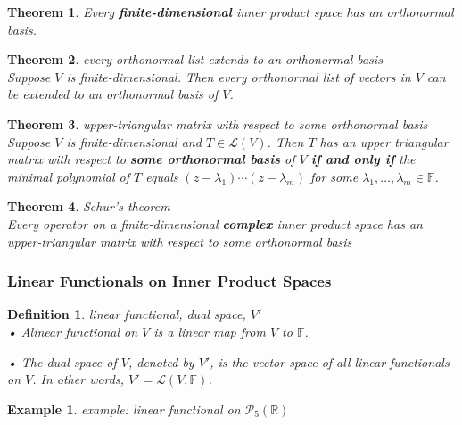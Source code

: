 \documentclass{article}
\newtheorem{theorem}{Theorem}[subsection]
\newtheorem{example}{Example}[subsection]
\newtheorem{definition}{Definition}[subsection]
\newcommand{\RR}{\mathbb{R}}
\newcommand{\FF}{\mathbb{F}}
\begin{document}
\begin{CJK}{UTF8}{gkai}
\begin{theorem}
    Every \textbf{finite-dimensional} inner product space has an orthonormal basis.
\end{theorem}

\begin{theorem}
    every orthonormal list extends to an orthonormal basis\\

    Suppose $V$ is finite-dimensional. Then every orthonormal list of vectors in $V$ can be extended to an orthonormal basis of $V$.
\end{theorem}

\begin{theorem}
    upper-triangular matrix with respect to some orthonormal basis\\

    Suppose $V$ is finite-dimensional and $T \in \mathcal{L}(V)$. Then $T$ has an upper triangular matrix with respect to \textbf{some orthonormal basis} of $V$ \textbf{if and only if} the minimal polynomial of $T$ equals $(z - \lambda_1)\cdots(z - \lambda_m)$ for some $\lambda_1,\ldots, \lambda_m \in \FF$.
\end{theorem}

\begin{theorem}
    Schur's theorem\\

    Every operator on a finite-dimensional \textbf{complex} inner product space has an upper-triangular matrix with respect to some orthonormal basis
\end{theorem}


\subsubsection{Linear Functionals on Inner Product Spaces}

\begin{definition}
    linear functional, dual space, $V'$\\

    • Alinear functional on $V$ is a linear map from $V$ to $\FF$.

    • The dual space of $V$, denoted by $V'$, is the vector space of all linear functionals on $V$. In other words, $V' = \mathcal{L}(V,\FF)$.
\end{definition}

\begin{example}
    example: linear functional on $\mathcal{P}_5(\RR)$\\


\end{example}
\end{CJK}
\end{document}

